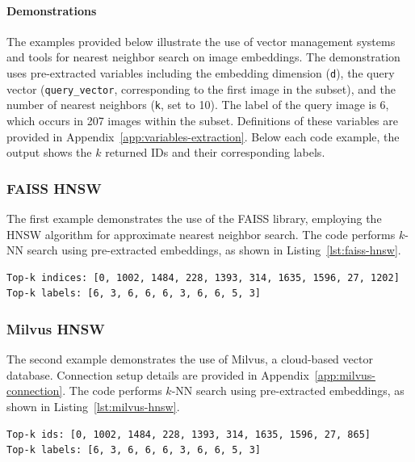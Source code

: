 \paragraph{Demonstrations}

The examples provided below illustrate the use of vector management systems and tools for nearest neighbor search on image embeddings. The demonstration uses pre-extracted variables including the embedding dimension (\texttt{d}), the query vector (\texttt{query\_vector}, corresponding to the first image in the subset), and the number of nearest neighbors (\texttt{k}, set to 10). The label of the query image is 6, which occurs in 207 images within the subset. Definitions of these variables are provided in Appendix~\ref{app:variables-extraction}. Below each code example, the output shows the $k$ returned IDs and their corresponding labels.

\subsubsection{FAISS HNSW}

The first example demonstrates the use of the FAISS library, employing the HNSW algorithm for approximate nearest neighbor search. The code performs $k$-NN search using pre-extracted embeddings, as shown in Listing~\ref{lst:faiss-hnsw}.


{\small
\begin{verbatim}
Top-k indices: [0, 1002, 1484, 228, 1393, 314, 1635, 1596, 27, 1202]
Top-k labels: [6, 3, 6, 6, 6, 3, 6, 6, 5, 3]
\end{verbatim}
}

\subsubsection{Milvus HNSW}

The second example demonstrates the use of Milvus, a cloud-based vector database. Connection setup details are provided in Appendix~\ref{app:milvus-connection}. The code performs $k$-NN search using pre-extracted embeddings, as shown in Listing~\ref{lst:milvus-hnsw}.


{\small
\begin{verbatim}
Top-k ids: [0, 1002, 1484, 228, 1393, 314, 1635, 1596, 27, 865]
Top-k labels: [6, 3, 6, 6, 6, 3, 6, 6, 5, 3]
\end{verbatim}
}

